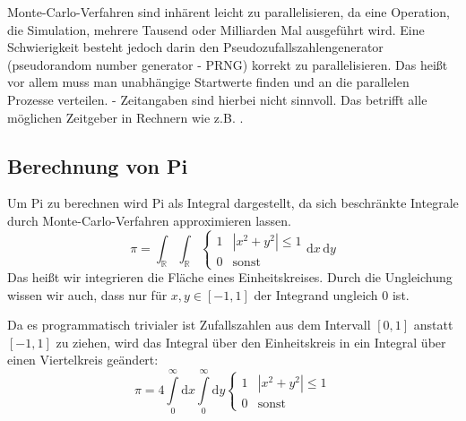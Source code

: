 Monte-Carlo-Verfahren sind inhärent leicht zu parallelisieren, da eine Operation, die Simulation, mehrere Tausend oder Milliarden Mal ausgeführt wird. Eine Schwierigkeit besteht jedoch darin den Pseudozufallszahlengenerator (pseudorandom number generator - PRNG) korrekt zu parallelisieren. Das heißt vor allem muss man unabhängige Startwerte finden und an die parallelen Prozesse verteilen.
 - Zeitangaben sind hierbei nicht sinnvoll. Das betrifft alle möglichen Zeitgeber in Rechnern wie z.B. .


\subsection{Berechnung von Pi}

Um Pi zu berechnen wird Pi als Integral dargestellt, da sich beschränkte Integrale durch Monte-Carlo-Verfahren approximieren lassen.
\begin{equation}
	\pi = \int_\mathbb{R} \int_\mathbb{R} \begin{cases}
					1 & |x^2+y^2| \leq 1\\
					0 & \text{sonst}
			   \end{cases}
		  \mathrm{d}x\,\mathrm{d}y
\end{equation}
Das heißt wir integrieren die Fläche eines Einheitskreises. Durch die Ungleichung wissen wir auch, dass nur für $x,y\in [-1,1]$ der Integrand ungleich $0$ ist.

Da es programmatisch trivialer ist Zufallszahlen aus dem Intervall $[0,1]$ anstatt $[-1,1]$ zu ziehen, wird das Integral über den Einheitskreis in ein Integral über einen Viertelkreis geändert:
\begin{equation}
	\label{eq:piint}
	\pi = 4 \int\limits_{0}^\infty \mathrm{d}x
		    \int\limits_{0}^\infty \mathrm{d}y
		    \begin{cases}1 & |x^2+y^2| \leq 1\\0 & \text{sonst} \end{cases}
\end{equation}


